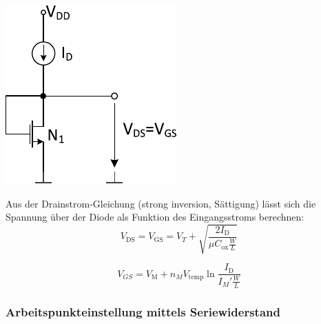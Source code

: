 \begin{minipage}[t]{0.3\columnwidth}
    \includegraphics[width=\columnwidth, align=t]{images/04_MOS_diode_mit_stromquelle.pdf}
\end{minipage}
\hfill
\begin{minipage}[t]{0.66\columnwidth}
    Aus der Drainstrom-Gleichung (strong inversion, Sättigung) lässt sich die Spannung über der Diode als Funktion des Eingangsstroms berechnen:
    \[
        V_\text{DS} = V_\text{GS} = V_T + \sqrt{\frac{2 I_\text{D}}{\mu C_\text{ox} \frac{W}{L}}}
    \]

    \[
        V_{GS} = V_\text{M} + n_M V_\text{temp} \ln{\frac{I_\text{D}}{I_M' \frac{W}{L}}}
    \]
\end{minipage}


\subsubsection{Arbeitspunkteinstellung mittels Seriewiderstand}

